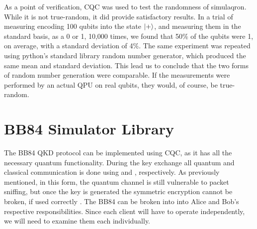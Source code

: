 As a point of verification, CQC was used to test the randomness of simulaqron.
While it is not true-random, it did provide satisfactory results.
In a trial of measuring encoding 100 qubits into the state $\ket{+}$, and measuring them in the standard basis, as a 0 or 1, 10,000 times, we found that 50\% of the qubits were 1, on average, with a standard deviation of 4\%. 
The same experiment was repeated using python's standard library random number generator, which produced the same mean and standard deviation.
This lead us to conclude that the two forms of random number generation were comparable. If the measurements were performed by an actual QPU on real qubits, they would, of course, be true-random.


\section{BB84 Simulator Library}
The BB84 QKD protocol can be implemented using CQC, as it has all the necessary quantum functionality.
During the key exchange all quantum and classical communication is done using  and , respectively.
As previously mentioned, in this form, the quantum channel is still vulnerable to packet sniffing, but once the key is generated the symmetric encryption cannot be broken, if used correctly \cite{cryptography}.
The BB84 can be broken into into Alice and Bob's respective responsibilities.
Since each client will have to operate independently, we will need to examine them each individually.

